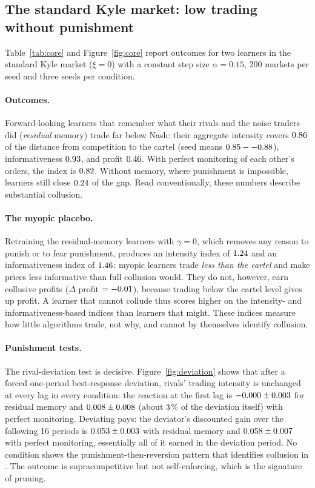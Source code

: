 \subsection{The standard Kyle market: low trading without punishment}
\label{sec:kyle}

Table~\ref{tab:core} and Figure~\ref{fig:core} report outcomes for two
learners in the standard Kyle market ($\xi=0$) with a constant step size
$\alpha=0.15$, 200 markets per seed and three seeds per condition.

\paragraph{Outcomes.} Forward-looking learners that remember what their rivals
and the noise traders did (\emph{residual} memory) trade far below Nash: their
aggregate intensity covers $0.86$ of the distance from competition to
the cartel (seed means $0.85--0.88$), informativeness $0.93$,
and profit $0.46$. With perfect monitoring of each other's
orders, the index is $0.82$. Without memory, where punishment is
impossible, learners still close $0.24$ of the gap. Read
conventionally, these numbers describe substantial collusion.

\paragraph{The myopic placebo.} Retraining the residual-memory learners with
$\gamma=0$, which removes any reason to punish or to fear punishment, produces
an intensity index of $1.24$ and an informativeness index of
$1.46$: myopic learners trade \emph{less than the cartel} and
make prices less informative than full collusion would. They do not, however,
earn collusive profits ($\Delta$ profit $=-0.01$), because
trading below the cartel level gives up profit. A learner that cannot collude
thus scores higher on the intensity- and informativeness-based indices than
learners that might. These indices measure how little algorithms trade, not
why, and cannot by themselves identify collusion.

\paragraph{Punishment tests.} The rival-deviation test is decisive.
Figure~\ref{fig:deviation} shows that after a forced one-period best-response
deviation, rivals' trading intensity is unchanged at every lag in every
condition: the reaction at the first lag is $-0.000\pm0.003$
for residual memory and $0.008\pm0.008$ (about
$3$\% of the deviation itself) with perfect monitoring.
Deviating pays: the deviator's discounted gain over the following 16 periods is
$0.053\pm0.003$ with residual memory and
$0.058\pm0.007$ with perfect monitoring, essentially all of it
earned in the deviation period. No condition shows the
punishment-then-reversion pattern that identifies collusion in
\citet{calvano2020}. The outcome is supracompetitive but not
self-enforcing, which is the signature of pruning.

